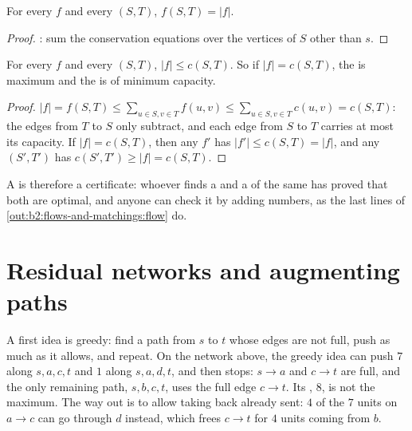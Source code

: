 \begin{proposition}\label{prop:b2:flows-and-matchings:flow-across-cut}
For every  $f$ and every  $(S, T)$, $f(S, T) = |f|$.
\end{proposition}

\begin{proof}
: sum the conservation equations over the vertices of $S$ other than $s$.
\end{proof}

\begin{corollary}\label{cor:b2:flows-and-matchings:weak-duality}
For every  $f$ and every  $(S, T)$, $|f| \leq c(S, T)$. So if $|f| = c(S, T)$, the  is maximum and the  is
of minimum capacity.
\end{corollary}

\begin{proof}
$|f| = f(S, T) \leq \sum_{u \in S, v \in T} f(u, v) \leq \sum_{u \in S, v \in T} c(u, v) = c(S, T)$: the edges from $T$ to
$S$ only subtract, and each edge from $S$ to $T$ carries at most its capacity. If $|f| = c(S, T)$, then any  $f'$ has
$|f'| \leq c(S, T) = |f|$, and any  $(S', T')$ has $c(S', T') \geq |f| = c(S, T)$.
\end{proof}

A  is therefore a certificate: whoever finds a  and a  of the same  has proved that both are optimal,
and anyone can check it by adding numbers, as the last lines of \cref{out:b2:flows-and-matchings:flow} do.

\section{Residual networks and augmenting paths}\label{sec:b2:flows-and-matchings:residual}

A first idea is greedy: find a path from $s$ to $t$ whose edges are not full, push as much as it allows, and repeat. On
the network above, the greedy idea can push $7$ along $s, a, c, t$ and $1$ along $s, a, d, t$, and then stops: $s \to a$
and $c \to t$ are full, and the only remaining path, $s, b, c, t$, uses the full edge $c \to t$. Its , $8$, is not
the maximum. The way out is to allow taking back  already sent: $4$ of the $7$ units on $a \to c$ can go through $d$
instead, which frees $c \to t$ for $4$ units coming from $b$.


